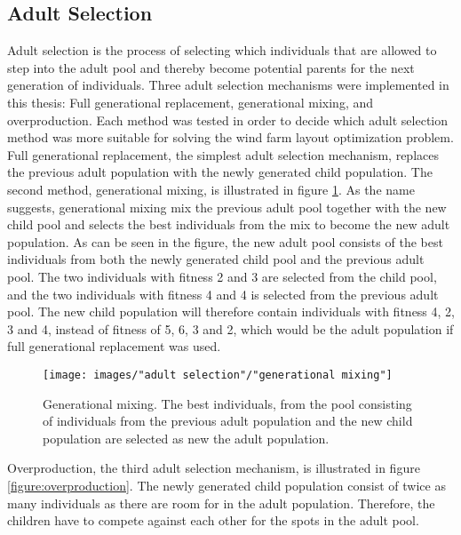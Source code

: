 \subsection{Adult Selection}\label{subsection:adult selection}
Adult selection is the process of selecting which individuals that are allowed to step into the adult pool and thereby become potential parents for the next generation of individuals. Three adult selection mechanisms were implemented in this thesis: Full generational replacement,  generational mixing, and overproduction. Each method was tested in order to decide which adult selection method was more suitable for solving the wind farm layout optimization problem. \\

\noindent Full generational replacement, the simplest adult selection mechanism, replaces the previous adult population with the newly generated child population. The second method, generational mixing, is illustrated in figure \ref{figure:generational mixing}. As the name suggests, generational mixing mix the previous adult pool together with the new child pool and selects the best individuals from the mix to become the new adult population. As can be seen in the figure, the new adult pool consists of the best individuals from both the newly generated child pool and the previous adult pool. The two individuals with fitness 2 and 3 are selected from the child pool, and the two individuals with fitness 4 and 4 is selected from the previous adult pool. The new child population will therefore contain individuals with fitness 4, 2, 3 and 4, instead of fitness of 5, 6, 3 and 2, which would be the adult population if full generational replacement was used. 


\begin{figure}[h!]
\begin{center}
\texttt{[image: images/"adult selection"/"generational mixing"]}
\caption{Generational mixing. The best individuals, from the pool consisting of individuals from the previous adult population and the new child population are selected as new the adult population.}
\label{figure:generational mixing}
\end{center}
\end{figure}


\noindent Overproduction, the third adult selection mechanism, is illustrated in figure \ref{figure:overproduction}. The newly generated child population consist of twice as many individuals as there are room for in the adult population. Therefore, the children have to compete against each other for the spots in the adult pool. \\


